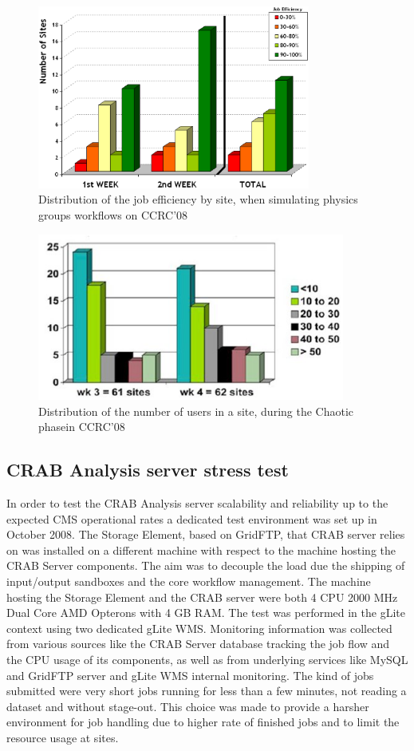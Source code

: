 \begin{figure}
\centering
\includegraphics[width=0.80\textwidth]{CCRC08SiteEff.eps}
\caption{Distribution of the job efficiency by site, when simulating physics
groups workflows on CCRC’08}
\label{fig:CCRC08SiteEff}
\end{figure}
\begin{figure}
\centering
\includegraphics[width=0.90\textwidth]{CCRC08Chaotic.eps}
\caption{Distribution of the number of users in a site, during the Chaotic phasein CCRC’08}
\label{fig:CCRC08Chaotic}
\end{figure}

\subsection{CRAB Analysis server stress test}
In order to test the CRAB Analysis server scalability and reliability up to
the expected CMS operational rates a dedicated test environment was
set up in October 2008. The Storage Element, based on GridFTP, 
that CRAB server relies on was installed on a different machine with 
respect to the machine hosting the CRAB Server components. The aim was 
to decouple the load
due the shipping of input/output sandboxes and the core workflow
management. The machine hosting the Storage Element and the CRAB
server were both 4 CPU 2000 MHz Dual Core AMD Opterons with 4 GB
RAM. The test was performed in the gLite context using two dedicated
gLite WMS. Monitoring information was collected from various sources
like the CRAB Server database tracking the job flow and the CPU usage
of its components, as well as from underlying services like MySQL and
GridFTP server and gLite WMS internal monitoring. The kind of
jobs submitted were very short jobs running for less than a few
minutes, not reading a dataset and without stage-out. This choice was
made to provide a harsher environment for job handling due to higher
rate of finished jobs and to limit the resource usage at sites.


